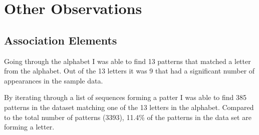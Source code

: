 
\section{Other Observations}

\subsection{Association Elements} \label{sec:associationelements}
	Going through the alphabet I was able to find 13 patterns that matched a letter from the alphabet. Out of the 13 letters it was 9 that had a significant number of appearances in the sample data. 

  By iterating through a list of sequences forming a patter I was able to find 385 patterns in the dataset matching one of the 13 letters in the alphabet. Compared to the total number of patterns (3393), 11.4\% of the patterns in the data set are forming a letter.

  \clearpage

